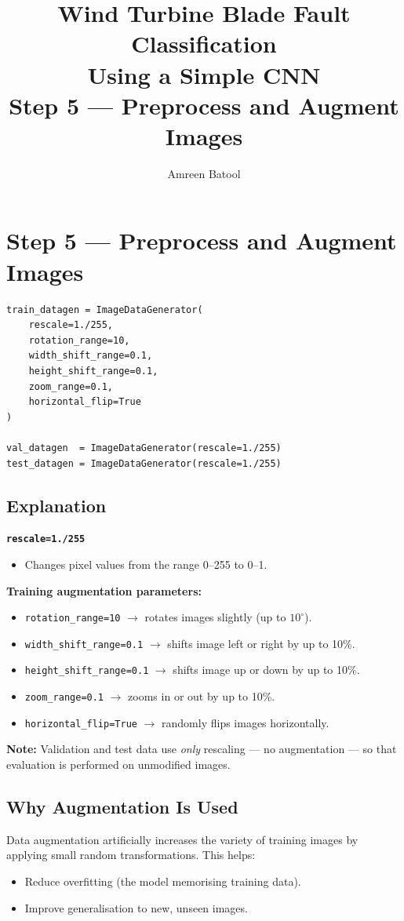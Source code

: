 \documentclass[12pt]{article}
\title{\textbf{Wind Turbine Blade Fault Classification\\Using a Simple CNN}\\[0.5em]
\large Step 5 --- Preprocess and Augment Images}
\author{Amreen Batool}
\date{}
\begin{document}
\maketitle

\section*{Step 5 --- Preprocess and Augment Images}

\begin{lstlisting}[style=pythonstyle]
train_datagen = ImageDataGenerator(
    rescale=1./255,
    rotation_range=10,
    width_shift_range=0.1,
    height_shift_range=0.1,
    zoom_range=0.1,
    horizontal_flip=True
)

val_datagen  = ImageDataGenerator(rescale=1./255)
test_datagen = ImageDataGenerator(rescale=1./255)
\end{lstlisting}

\subsection*{Explanation}

\textbf{\texttt{rescale=1./255}}
\begin{itemize}
    \item Changes pixel values from the range 0--255 to 0--1.
\end{itemize}

\textbf{Training augmentation parameters:}
\begin{itemize}
    \item \texttt{rotation\_range=10} $\rightarrow$ rotates images slightly (up to $10^\circ$).
    \item \texttt{width\_shift\_range=0.1} $\rightarrow$ shifts image left or right by up to 10\%.
    \item \texttt{height\_shift\_range=0.1} $\rightarrow$ shifts image up or down by up to 10\%.
    \item \texttt{zoom\_range=0.1} $\rightarrow$ zooms in or out by up to 10\%.
    \item \texttt{horizontal\_flip=True} $\rightarrow$ randomly flips images horizontally.
\end{itemize}

\textbf{Note:} Validation and test data use \emph{only} rescaling — no augmentation — so that evaluation is performed on unmodified images.

\subsection*{Why Augmentation Is Used}

Data augmentation artificially increases the variety of training images by applying small random transformations. This helps:
\begin{itemize}
    \item Reduce overfitting (the model memorising training data).
    \item Improve generalisation to new, unseen images.
\end{itemize}
\end{document}
